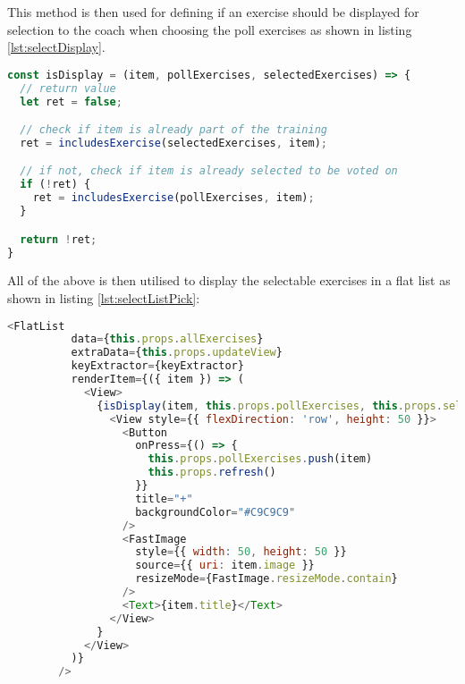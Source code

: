 This method is then used for defining if an exercise should be displayed for selection to the coach when choosing the poll exercises as shown in listing \ref{lst:selectDisplay}.
\begin{lstlisting}[language=javascript, caption=Display Exercise Method, label=lst:selectDisplay]
const isDisplay = (item, pollExercises, selectedExercises) => {
  // return value
  let ret = false;

  // check if item is already part of the training
  ret = includesExercise(selectedExercises, item);

  // if not, check if item is already selected to be voted on
  if (!ret) {
    ret = includesExercise(pollExercises, item);
  }

  return !ret;
}
\end{lstlisting}
All of the above is then utilised to display the selectable exercises in a flat list as shown in listing \ref{lst:selectListPick}:
\begin{lstlisting}[language=javascript, caption=Flatlist Selectable, label=lst:selectListPick]
        <FlatList
          data={this.props.allExercises}
          extraData={this.props.updateView}
          keyExtractor={keyExtractor}
          renderItem={({ item }) => (
            <View>
              {isDisplay(item, this.props.pollExercises, this.props.selectedExercises) &&
                <View style={{ flexDirection: 'row', height: 50 }}>
                  <Button
                    onPress={() => {
                      this.props.pollExercises.push(item)
                      this.props.refresh()
                    }}
                    title="+"
                    backgroundColor="#C9C9C9"
                  />
                  <FastImage
                    style={{ width: 50, height: 50 }}
                    source={{ uri: item.image }}
                    resizeMode={FastImage.resizeMode.contain}
                  />
                  <Text>{item.title}</Text>
                </View>
              }
            </View>
          )}
        />
\end{lstlisting}

